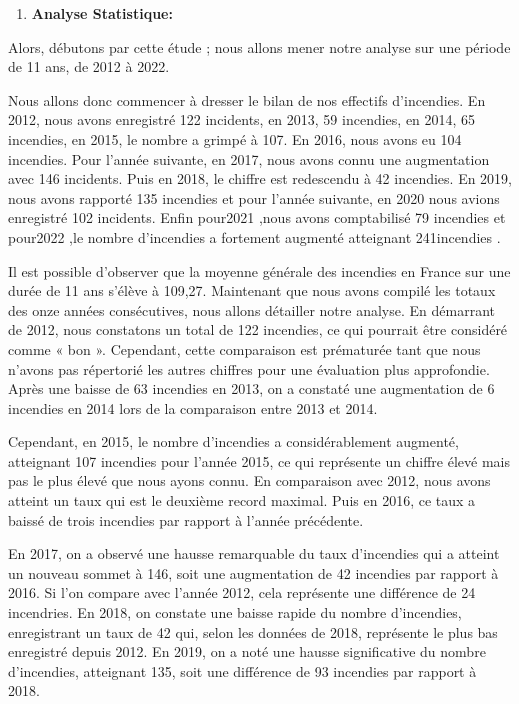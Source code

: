 \documentclass[
]{article}
\providecommand{\tightlist}{%
  \setlength{\itemsep}{0pt}\setlength{\parskip}{0pt}}
\begin{document}
\begin{enumerate}
\def\labelenumi{\arabic{enumi}.}
\setcounter{enumi}{1}
\tightlist
\item
  \textbf{Analyse Statistique:}
\end{enumerate}

Alors, débutons par cette étude ; nous allons mener notre analyse sur
une période de 11 ans, de 2012 à 2022.

Nous allons donc commencer à dresser le bilan de nos effectifs
d'incendies. En 2012, nous avons enregistré 122 incidents, en 2013, 59
incendies, en 2014, 65 incendies, en 2015, le nombre a grimpé à 107. En
2016, nous avons eu 104 incendies. Pour l'année suivante, en 2017, nous
avons connu une augmentation avec 146 incidents. Puis en 2018, le
chiffre est redescendu à 42 incendies. En 2019, nous avons rapporté 135
incendies et pour l'année suivante, en 2020 nous avions enregistré 102
incidents. Enfin pour2021 ,nous avons comptabilisé 79 incendies et
pour2022 ,le nombre d'incendies a fortement augmenté atteignant
241incendies .

Il est possible d'observer que la moyenne générale des incendies en
France sur une durée de 11 ans s'élève à 109,27. Maintenant que nous
avons compilé les totaux des onze années consécutives, nous allons
détailler notre analyse. En démarrant de 2012, nous constatons un total
de 122 incendies, ce qui pourrait être considéré comme « bon ».
Cependant, cette comparaison est prématurée tant que nous n'avons pas
répertorié les autres chiffres pour une évaluation plus approfondie.
Après une baisse de 63 incendies en 2013, on a constaté une augmentation
de 6 incendies en 2014 lors de la comparaison entre 2013 et 2014.

Cependant, en 2015, le nombre d'incendies a considérablement augmenté,
atteignant 107 incendies pour l'année 2015, ce qui représente un chiffre
élevé mais pas le plus élevé que nous ayons connu. En comparaison avec
2012, nous avons atteint un taux qui est le deuxième record maximal.
Puis en 2016, ce taux a baissé de trois incendies par rapport à l'année
précédente.

En 2017, on a observé une hausse remarquable du taux d'incendies qui a
atteint un nouveau sommet à 146, soit une augmentation de 42 incendies
par rapport à 2016. Si l'on compare avec l'année 2012, cela représente
une différence de 24 incendries. En 2018, on constate une baisse rapide
du nombre d'incendies, enregistrant un taux de 42 qui, selon les données
de 2018, représente le plus bas enregistré depuis 2012. En 2019, on a
noté une hausse significative du nombre d'incendies, atteignant 135,
soit une différence de 93 incendies par rapport à 2018.
\end{document}
